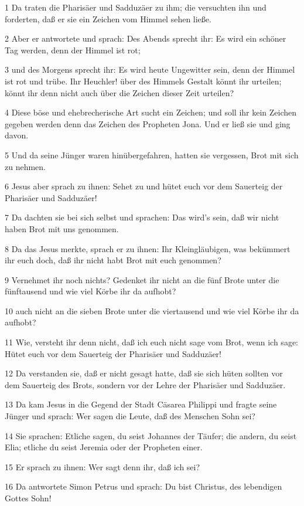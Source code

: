 \par 1 Da traten die Pharisäer und Sadduzäer zu ihm; die versuchten ihn und forderten, daß er sie ein Zeichen vom Himmel sehen ließe.
\par 2 Aber er antwortete und sprach: Des Abends sprecht ihr: Es wird ein schöner Tag werden, denn der Himmel ist rot;
\par 3 und des Morgens sprecht ihr: Es wird heute Ungewitter sein, denn der Himmel ist rot und trübe. Ihr Heuchler! über des Himmels Gestalt könnt ihr urteilen; könnt ihr denn nicht auch über die Zeichen dieser Zeit urteilen?
\par 4 Diese böse und ehebrecherische Art sucht ein Zeichen; und soll ihr kein Zeichen gegeben werden denn das Zeichen des Propheten Jona. Und er ließ sie und ging davon.
\par 5 Und da seine Jünger waren hinübergefahren, hatten sie vergessen, Brot mit sich zu nehmen.
\par 6 Jesus aber sprach zu ihnen: Sehet zu und hütet euch vor dem Sauerteig der Pharisäer und Sadduzäer!
\par 7 Da dachten sie bei sich selbst und sprachen: Das wird's sein, daß wir nicht haben Brot mit uns genommen.
\par 8 Da das Jesus merkte, sprach er zu ihnen: Ihr Kleingläubigen, was bekümmert ihr euch doch, daß ihr nicht habt Brot mit euch genommen?
\par 9 Vernehmet ihr noch nichts? Gedenket ihr nicht an die fünf Brote unter die fünftausend und wie viel Körbe ihr da aufhobt?
\par 10 auch nicht an die sieben Brote unter die viertausend und wie viel Körbe ihr da aufhobt?
\par 11 Wie, versteht ihr denn nicht, daß ich euch nicht sage vom Brot, wenn ich sage: Hütet euch vor dem Sauerteig der Pharisäer und Sadduzäer!
\par 12 Da verstanden sie, daß er nicht gesagt hatte, daß sie sich hüten sollten vor dem Sauerteig des Brots, sondern vor der Lehre der Pharisäer und Sadduzäer.
\par 13 Da kam Jesus in die Gegend der Stadt Cäsarea Philippi und fragte seine Jünger und sprach: Wer sagen die Leute, daß des Menschen Sohn sei?
\par 14 Sie sprachen: Etliche sagen, du seist Johannes der Täufer; die andern, du seist Elia; etliche du seist Jeremia oder der Propheten einer.
\par 15 Er sprach zu ihnen: Wer sagt denn ihr, daß ich sei?
\par 16 Da antwortete Simon Petrus und sprach: Du bist Christus, des lebendigen Gottes Sohn!
